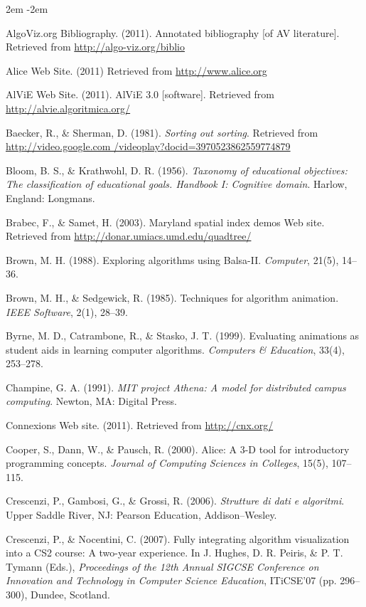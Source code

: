 
\begin{chatext}
{
\leftskip 2em
\parindent -2em

AlgoViz.org Bibliography. (2011). Annotated bibliography [of AV literature]. Retrieved from \url{http://algo-viz.org/biblio}

Alice Web Site. (2011) Retrieved from \url{http://www.alice.org}

AlViE Web Site. (2011). AlViE 3.0 [software]. Retrieved from \url{http://alvie.algoritmica.org/}

Baecker, R., \& Sherman, D. (1981). \textit{Sorting out sorting}. Retrieved from \url{http://video.google.com /videoplay?docid=3970523862559774879}

Bloom, B. S., \& Krathwohl, D. R. (1956). \textit{Taxonomy of educational objectives: The classification of educational goals. Handbook I: Cognitive domain}. Harlow, England: Longmans.

Brabec, F., \& Samet, H. (2003). Maryland spatial index demos Web site. Retrieved from \url{http://donar.umiacs.umd.edu/quadtree/}

Brown, M. H. (1988). Exploring algorithms using Balsa-II. \textit{Computer}, 21(5), 14–36.

Brown, M. H., \& Sedgewick, R. (1985). Techniques for algorithm animation. \textit{IEEE Software}, 2(1), 28–39.

Byrne, M. D., Catrambone, R., \& Stasko, J. T. (1999). Evaluating animations as student aids in learning computer algorithms. \textit{Computers \& Education}, 33(4), 253–278.

Champine, G. A. (1991). \textit{MIT project Athena: A model for distributed campus computing}. Newton, MA: Digital Press.

Connexions Web site. (2011). Retrieved from \url{http://cnx.org/}

Cooper, S., Dann, W., \& Pausch, R. (2000). Alice: A 3-D tool for introductory programming concepts. \textit{Journal of Computing Sciences in Colleges}, 15(5), 107–115.

Crescenzi, P., Gambosi, G., \& Grossi, R. (2006). \textit{Strutture di dati e algoritmi}. Upper Saddle River, NJ: Pearson Education, Addison–Wesley.

Crescenzi, P., \& Nocentini, C. (2007). Fully integrating algorithm visualization into a CS2 course: A two-year experience. In J. Hughes, D. R. Peiris, \& P. T. Tymann (Eds.), \textit{Proceedings of the 12th Annual SIGCSE Conference on Innovation and Technology in Computer Science Education}, ITiCSE’07 (pp. 296–300), Dundee, Scotland.

}
\end{chatext}
